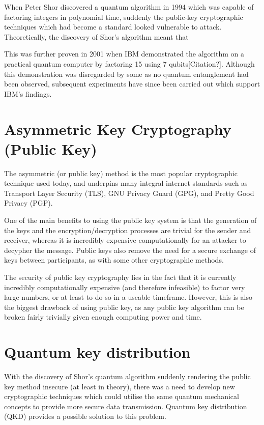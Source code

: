 \documentclass[runningheads,a4paper]{llncs}
\begin{document}
When Peter Shor discovered a quantum algorithm in 1994 which was capable of factoring integers in polynomial time\cite{Shor:1994fk}, suddenly the public-key cryptographic techniques which had become a standard looked vulnerable to attack. Theoretically, the discovery of Shor's algorithm meant that 

This was further proven in 2001 when IBM demonstrated the algorithm on a practical quantum computer by factoring 15 using 7 qubits[Citation?]. Although this demonstration was disregarded by some as no quantum entanglement had been observed, subsequent experiments have since been carried out which support IBM's findings\cite{Lu:2007uq}.

\section{Asymmetric Key Cryptography (Public Key)} 

The asymmetric (or public key) method is the most popular cryptographic technique used today, and underpins many integral internet standards such as Transport Layer Security (TLS), GNU Privacy Guard (GPG), and Pretty Good Privacy (PGP).

One of the main benefits to using the public key system is that the generation of the keys and the encryption/decryption processes are trivial for the sender and receiver, whereas it is incredibly expensive computationally for an attacker to decypher the message. Public keys also remove the need for a secure exchange of keys between participants, as with some other cryptographic methods.

The security of public key cryptography lies in the fact that it is currently incredibly computationally expensive (and therefore infeasible) to factor very large numbers, or at least to do so in a useable timeframe. However, this is also the biggest drawback of using public key, as any public key algorithm can be broken fairly trivially given enough computing power and time.

\section{Quantum key distribution}

With the discovery of Shor's quantum algorithm suddenly rendering the public key method insecure (at least in theory), there was a need to develop new cryptographic techniques which could utilise the same quantum mechanical concepts to provide more secure data transmission. Quantum key distribution (QKD) provides a possible solution to this problem.
\end{document}
